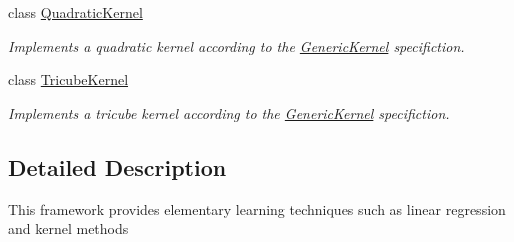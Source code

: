 \begin{DoxyCompactItemize}
class \hyperlink{classQuadraticKernel}{\-Quadratic\-Kernel}
\begin{DoxyCompactList}\small\item\em \-Implements a quadratic kernel according to the \hyperlink{classGenericKernel}{\-Generic\-Kernel} specifiction. \end{DoxyCompactList}\item 
class \hyperlink{classTricubeKernel}{\-Tricube\-Kernel}
\begin{DoxyCompactList}\small\item\em \-Implements a tricube kernel according to the \hyperlink{classGenericKernel}{\-Generic\-Kernel} specifiction. \end{DoxyCompactList}\end{DoxyCompactItemize}


\subsection{\-Detailed \-Description}
\-This framework provides elementary learning techniques such as linear regression and kernel methods 